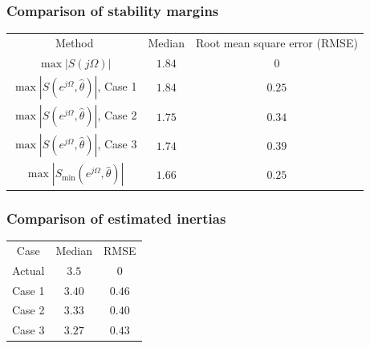 \begin{frame}
	\frametitle{Comparison of stability margins}
			\begin{tabular}{c c c}
			\toprule
			Method & Median & Root mean square error (RMSE) \\
			$\max |S(j\Omega)|$ & $1.84$ & $0$ \\
			$\max |S(e^{j\Omega},\hat{\theta})|$, Case 1 & $1.84$ & $0.25$ \\
			$\max |S(e^{j\Omega},\hat{\theta})|$, Case 2 & $1.75$ & $0.34$ \\
			$\max |S(e^{j\Omega},\hat{\theta})|$, Case 3 & $1.74$ & $0.39$ \\
			$\max |S_{\min}(e^{j\Omega},\hat{\theta})|$ & $1.66$ & $0.25$ \\
			\bottomrule
	\end{tabular}
\end{frame}
\begin{frame}
	\frametitle{Comparison of estimated inertias}
	\begin{tabular}{c c c}
			\toprule
			Case & Median & RMSE \\
			Actual & $3.5$ & $0$ \\
			Case 1& $3.40$ & $0.46$ \\
			Case 2 & $3.33$ & $0.40$ \\
			Case 3 & $3.27$ & $0.43$ \\
			\bottomrule
	\end{tabular}
\end{frame}
